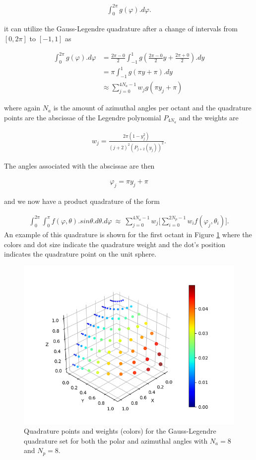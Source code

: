 \documentclass[11pt,letterpaper,titlepage]{article}
\newcommand{\beq}{\begin{equation*}
\begin{aligned}}
\newcommand{\eeq}{\end{aligned}
\end{equation*}}
\newcommand{\beqn}{\begin{equation}
	\begin{aligned}}
\newcommand{\eeqn}{\end{aligned}
	\end{equation}}
\numberwithin{equation}{section}
\begin{document}
\begin{appendices}
\beq
\int_0^{2\pi} g(\varphi).d\varphi.
\eeq

it can utilize the Gauss-Legendre quadrature after a change of intervals from $[0,2\pi]$ to $[-1,1]$ as

\beq
\int_0^{2\pi} g(\varphi).d\varphi 
&= \frac{2\pi-0}{2}\int_{-1}^1 g(\frac{2\pi-0}{2} y + \frac{2\pi+0}{2}).dy \\
&= \pi \int_{-1}^1 g(\pi y + \pi).dy \\
&\approx  \sum_{j=0}^{4N_a-1} w_j g(\pi y_j+\pi)
\eeq

where again $N_a$ is the amount of azimuthal angles per octant and the quadrature points are the abscissae of the Legendre polynomial $P_{4N_a}$ and the weights are 

\beqn
w_j = \frac{2\pi(1-y_j^2)}{(j+2)^2  (P_{j+2}(y_j))^2}.
\eeqn

The angles associated with the abscissae are then 

\beqn
\varphi_j =\pi y_j + \pi
\eeqn

and we now have a product quadrature of the form

\beqn
\int_0^{2\pi}\int_0^\pi f(\varphi,\theta).sin\theta.d\theta.d\varphi\ 
\approx \  \sum_{j=0}^{4N_a-1} w_j \biggr[
\sum_{i=0} ^{2N_p-1}   w_i f(\varphi_j,\theta_i)
\biggr].
\eeqn
\newline
An example of this quadrature is shown for the first octant in Figure \ref{fig:s8gausslegendrelegendre} where the colors and dot size indicate the quadrature weight and the dot's position indicates the quadrature point on the unit sphere.
\begin{figure}[h]
\centering
\includegraphics[width=0.7\linewidth]{Gauss-Legendre-Legendre.png}
\caption{Quadrature points and weights (colors) for the Gauss-Legendre quadrature set for both the polar and azimuthal angles with $N_a=8$ and $N_p=8$.}
\label{fig:s8gausslegendrelegendre}
\end{figure}


\end{appendices}
\end{document}
